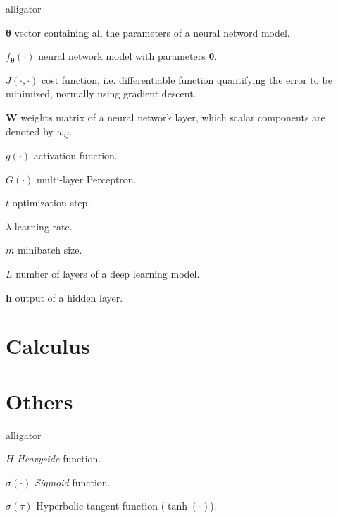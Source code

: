 \begin{labeling}{alligator}
	\item [$\mathbf{\theta}$] vector containing all the parameters of a neural netword model.
	\item [$f_\mathbf{\theta}(\cdot)$] neural network model with parameters $\mathbf{\theta}$.
	\item [$J(\cdot, \cdot)$] cost function, i.e. differentiable function quantifying the error to be minimized, normally using gradient descent.
	\item [$\mathbf{W}$] weights matrix of a neural network layer, which scalar components are denoted by $w_{ij}$.
	\item[$g(\cdot)$] activation function.
	\item[$G(\cdot)$] multi-layer Perceptron.
	\item[$t$] optimization step.
	\item[$\lambda$] learning rate.
	\item[$m$] minibatch size.
	\item[$L$] number of layers of a deep learning model.
	\item[$\mathbf{h}$] output of a hidden layer.
\end{labeling}


\section*{Calculus}

\section*{Others}
\begin{labeling}{alligator}
	\item [$H$] \textit{Heavyside} function.
	\item [$\sigma(\cdot)$] \textit{Sigmoid} function.
	\item [$\sigma(\tau)$] Hyperbolic tangent function ($\tanh(\cdot)$).
	
\end{labeling}